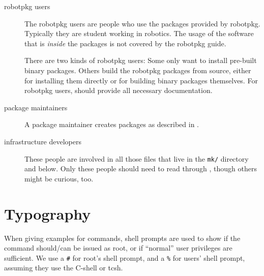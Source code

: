 \begin{description}
   \item[robotpkg users] The  robotpkg users  are people  who  use the packages
   provided by robotpkg.  Typically they are student  working  in robotics. The
   usage  of the software  that is {\em inside} the  packages is not covered by
   the robotpkg guide.

   There are two  kinds of robotpkg users:  Some only want to install pre-built
   binary packages.  Others build the robotpkg packages from source, either for
   installing them  directly or for building binary   packages themselves.  For
   robotpkg users,   should provide
   all necessary documentation.

   \item[package  maintainers]   A   package maintainer  creates  packages   as
   described in .

   \item[infrastructure  developers]  These people are    involved in all those
   files that live  in the {\tt mk/} directory   and below.  Only  these people
   should             need          to               read               through
   , though others might be
   curious, too.

\end{description}


\section{Typography} %

When giving examples for  commands,  shell prompts  are  used  to show if   the
command  should/can be issued  as  root, or if  ``normal''  user privileges are
sufficient. We use  a {\tt \#}  for  root's shell  prompt, and  a {\tt \%}  for
users' shell prompt, assuming they use the C-shell or tcsh.
